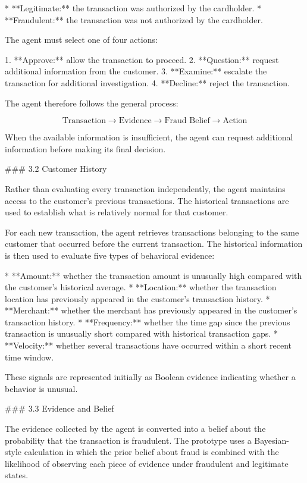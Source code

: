 * **Legitimate:** the transaction was authorized by the cardholder.
* **Fraudulent:** the transaction was not authorized by the cardholder.

The agent must select one of four actions:

1. **Approve:** allow the transaction to proceed.
2. **Question:** request additional information from the customer.
3. **Examine:** escalate the transaction for additional investigation.
4. **Decline:** reject the transaction.

The agent therefore follows the general process:

$$
\text{Transaction} \rightarrow \text{Evidence} \rightarrow \text{Fraud Belief} \rightarrow \text{Action}
$$

When the available information is insufficient, the agent can request additional information before making its final decision.

### 3.2 Customer History

Rather than evaluating every transaction independently, the agent maintains access to the customer's previous transactions. The historical transactions are used to establish what is relatively normal for that customer.

For each new transaction, the agent retrieves transactions belonging to the same customer that occurred before the current transaction. The historical information is then used to evaluate five types of behavioral evidence:

* **Amount:** whether the transaction amount is unusually high compared with the customer's historical average.
* **Location:** whether the transaction location has previously appeared in the customer's transaction history.
* **Merchant:** whether the merchant has previously appeared in the customer's transaction history.
* **Frequency:** whether the time gap since the previous transaction is unusually short compared with historical transaction gaps.
* **Velocity:** whether several transactions have occurred within a short recent time window.

These signals are represented initially as Boolean evidence indicating whether a behavior is unusual.

### 3.3 Evidence and Belief

The evidence collected by the agent is converted into a belief about the probability that the transaction is fraudulent. The prototype uses a Bayesian-style calculation in which the prior belief about fraud is combined with the likelihood of observing each piece of evidence under fraudulent and legitimate states.

